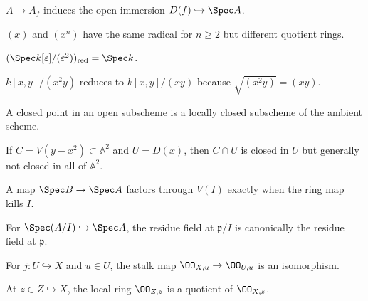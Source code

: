 \begin{example}\label{ex:vi22-e11}
$A\to A_f$ induces the open immersion $D(f)\hookrightarrow\Spec A$.
\end{example}

\begin{example}\label{ex:vi22-e12}
$(x)$ and $(x^n)$ have the same radical for $n\ge2$ but different quotient rings.
\end{example}

\begin{example}\label{ex:vi22-e13}
$(\Spec k[\varepsilon]/(\varepsilon^2))_{\rm red}=\Spec k$.
\end{example}

\begin{example}\label{ex:vi22-e14}
$k[x,y]/(x^2y)$ reduces to $k[x,y]/(xy)$ because $\sqrt{(x^2y)}=(xy)$.
\end{example}

\begin{example}\label{ex:vi22-e15}
A closed point in an open subscheme is a locally closed subscheme of the ambient scheme.
\end{example}

\begin{example}\label{ex:vi22-e16}
If $C=V(y-x^2)\subset\mathbb A^2$ and $U=D(x)$, then $C\cap U$ is closed in $U$ but generally not closed in all of $\mathbb A^2$.
\end{example}

\begin{example}\label{ex:vi22-e17}
A map $\Spec B\to\Spec A$ factors through $V(I)$ exactly when the ring map kills $I$.
\end{example}

\begin{example}\label{ex:vi22-e18}
For $\Spec(A/I)\hookrightarrow\Spec A$, the residue field at $\mathfrak p/I$ is canonically the residue field at $\mathfrak p$.
\end{example}

\begin{example}\label{ex:vi22-e19}
For $j:U\hookrightarrow X$ and $u\in U$, the stalk map $\OO_{X,u}\to\OO_{U,u}$ is an isomorphism.
\end{example}

\begin{example}\label{ex:vi22-e20}
At $z\in Z\hookrightarrow X$, the local ring $\OO_{Z,z}$ is a quotient of $\OO_{X,z}$.
\end{example}

